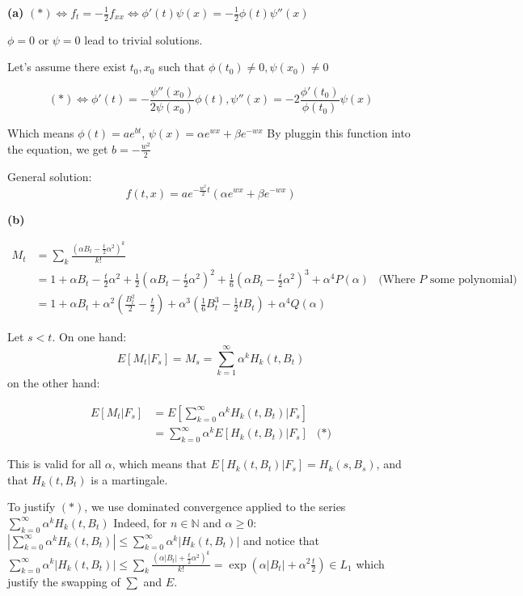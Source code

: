\documentclass[11pt]{article}
\begin{document}
\textbf{(a)}
\((*) \iff f_t = -\frac12 f_{xx} \iff \phi'(t) \psi(x) = -\frac12 \phi(t)\psi''(x)\)


\(\phi = 0\) or \(\psi = 0\) lead to trivial solutions.

Let's assume there exist \(t_0, x_0\) such that \(\phi(t_0) \ne 0, \psi(x_0) \ne 0\)

$$(*) \iff \phi'(t) = -\frac{\psi''(x_0)}{2\psi(x_0)} \phi(t), \psi''(x) = -2 \frac{\phi'(t_0)}{\phi(t_0)} \psi(x)$$

Which means \(\phi(t) = ae^{bt}\), \(\psi(x) = \alpha e^{wx} + \beta e^{-wx}\)
By pluggin this function into the equation, we get \(b = -\frac{w^2}2\)

General solution:
$$f(t, x) = a e^{-\frac{w^2}2 t}( \alpha e^{wx} + \beta e^{-wx})$$

\textbf{(b)}

\begin{align*}
M_t
&= \sum_k  \frac{(\alpha B_t - \frac{t}2 \alpha^2)^k}{k!}
\\&= 1 + \alpha B_t - \frac{t}2 \alpha^2 + \frac12 (\alpha B_t - \frac{t}2 \alpha^2)^2 + \frac16 (\alpha B_t - \frac{t}2 \alpha^2)^3 + \alpha^4 P(\alpha) &\text{(Where $P$ some polynomial)}
\\&= 1 + \alpha B_t + \alpha^2 (\frac{B_t^2}2- \frac{t}2) + \alpha^3 (\frac16 B_t^3-\frac{1}2 tB_t) + \alpha^4Q(\alpha)
\end{align*}


Let \(s < t\).
On one hand:
$$E[M_t | F_s] = M_s = \sum_{k=1}^{\infty} \alpha^k H_k(t, B_t)$$
on the other hand:

\begin{align*}
E[M_t | F_s] &= E[\sum_{k=0}^{\infty} \alpha^k H_k(t, B_t) | F_s]
\\&= \sum_{k=0}^{\infty} \alpha^k E[H_k(t, B_t) | F_s] &\text{(*)}
\end{align*}

This is valid for all \(\alpha\), which means that \(E[H_k(t, B_t) | F_s] = H_k(s, B_s)\), and that \(H_k(t, B_t)\) is a martingale.

To justify \((*)\), we use dominated convergence applied to the series \(\sum_{k=0}^{\infty} \alpha^k H_k(t, B_t)\)
Indeed, for \(n \in \mathbb N\) and \(\alpha \ge 0\):
\(|\sum_{k=0}^{\infty} \alpha^k H_k(t, B_t)| \le \sum_{k=0}^{\infty} \alpha^k |H_k(t, B_t)|\)
and notice that \(\sum_{k=0}^{\infty} \alpha^k |H_k(t, B_t)| \le \sum_k  \frac{(\alpha |B_t| + \frac{t}2 \alpha^2)^k}{k!} = \exp(\alpha|B_t| + \alpha^2 \frac{t}2) \in L_1\)
which justify the swapping of \(\sum\) and \(E\).
\end{document}
